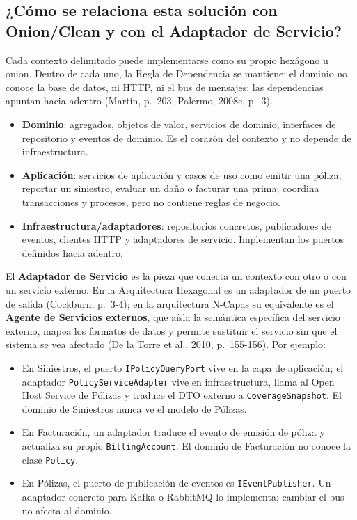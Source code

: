 \documentclass[12pt,a4paper]{article}
\begin{document}
\subsection{¿Cómo se relaciona esta solución con Onion/Clean y con el Adaptador de Servicio?}

Cada contexto delimitado puede implementarse como su propio hexágono u onion. Dentro de cada uno, la Regla de Dependencia se mantiene: el dominio no conoce la base de datos, ni HTTP, ni el bus de mensajes; las dependencias apuntan hacia adentro (Martin, p.~203; Palermo, 2008c, p.~3).

\begin{itemize}[label=$\cdot$]
  \item \textbf{Dominio}: agregados, objetos de valor, servicios de dominio, interfaces de repositorio y eventos de dominio. Es el corazón del contexto y no depende de infraestructura.
  \item \textbf{Aplicación}: servicios de aplicación y casos de uso como emitir una póliza, reportar un siniestro, evaluar un daño o facturar una prima; coordina transacciones y procesos, pero no contiene reglas de negocio.
  \item \textbf{Infraestructura/adaptadores}: repositorios concretos, publicadores de eventos, clientes HTTP y adaptadores de servicio. Implementan los puertos definidos hacia adentro.
\end{itemize}

El \textbf{Adaptador de Servicio} es la pieza que conecta un contexto con otro o con un servicio externo. En la Arquitectura Hexagonal es un adaptador de un puerto de salida (Cockburn, p.~3-4); en la arquitectura N-Capas su equivalente es el \textbf{Agente de Servicios externos}, que aísla la semántica específica del servicio externo, mapea los formatos de datos y permite sustituir el servicio sin que el sistema se vea afectado (De la Torre et al., 2010, p.~155-156). Por ejemplo:

\begin{itemize}[label=$\cdot$]
  \item En Siniestros, el puerto \texttt{IPolicyQueryPort} vive en la capa de aplicación; el adaptador \texttt{PolicyServiceAdapter} vive en infraestructura, llama al Open Host Service de Pólizas y traduce el DTO externo a \texttt{CoverageSnapshot}. El dominio de Siniestros nunca ve el modelo de Pólizas.
  \item En Facturación, un adaptador traduce el evento de emisión de póliza y actualiza su propio \texttt{BillingAccount}. El dominio de Facturación no conoce la clase \texttt{Policy}.
  \item En Pólizas, el puerto de publicación de eventos es \texttt{IEventPublisher}. Un adaptador concreto para Kafka o RabbitMQ lo implementa; cambiar el bus no afecta al dominio.
\end{itemize}
\end{document}
